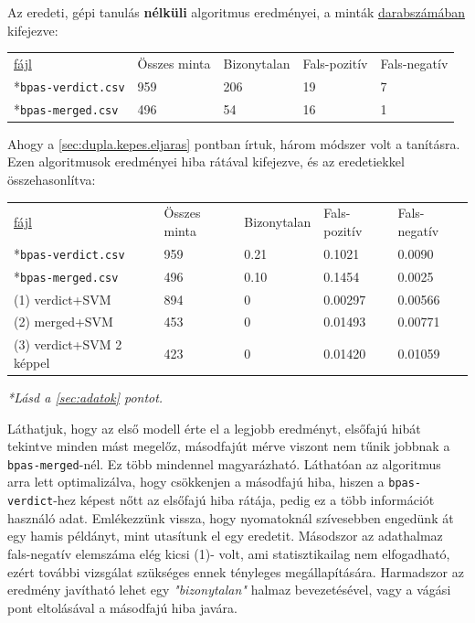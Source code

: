 \noindent
Az eredeti, gépi tanulás \textbf{nélküli} algoritmus eredményei, a minták \underline{darabszámában} 
kifejezve:

\begin{tabular}{ l l l l l }
	\underline{fájl} 			& Összes minta 	& Bizonytalan	& Fals-pozitív	& Fals-negatív \\
	*\texttt{bpas-verdict.csv} 	& 959 			& 206 			& 19	 	& 7			\\
	*\texttt{bpas-merged.csv} 	& 496			& 54 			& 16		& 1			\\
\end{tabular}

\mbox{}

\noindent
Ahogy a \ref{sec:dupla.kepes.eljaras} pontban írtuk, három módszer volt a tanításra.
Ezen algoritmusok eredményei hiba rátával kifejezve, és az eredetiekkel összehasonlítva:


\begin{tabular}{ l l l l l }
	\underline{fájl} 			& Összes minta 	& Bizonytalan	& Fals-pozitív	& Fals-negatív \\
	*\texttt{bpas-verdict.csv} 	& 959 			& 0.21			& 0.1021 	& 0.0090 	\\
	*\texttt{bpas-merged.csv} 	& 496			& 0.10			& 0.1454 	& 0.0025   \\
	
	\hline
	(1) verdict+SVM					& 894			& 0				& 0.00297	& 0.00566	\\
	(2) merged+SVM					& 453			& 0				& 0.01493	& 0.00771	\\
	(3) verdict+SVM 2 képpel		& 423			& 0				& 0.01420	& 0.01059   \\
	
\end{tabular}

\mbox{}


\textit{*Lásd a \ref{sec:adatok} pontot.}

\mbox{}



Láthatjuk, hogy az első modell érte el a legjobb eredményt, elsőfajú hibát tekintve minden mást megelőz, 
másodfajút mérve viszont nem tűnik jobbnak a \texttt{bpas-merged}-nél. Ez több mindennel magyarázható.
Láthatóan az algoritmus arra lett optimalizálva, hogy csökkenjen a másodfajú hiba, hiszen a 
\texttt{bpas-verdict}-hez képest nőtt az elsőfajú hiba rátája, pedig ez a több információt használó adat.
Emlékezzünk vissza, hogy nyomatoknál szívesebben engedünk át egy hamis példányt, mint utasítunk
el egy eredetit. Másodszor az adathalmaz fals-negatív elemszáma elég kicsi (1)- volt, ami 
statisztikailag nem elfogadható, ezért további vizsgálat szükséges ennek tényleges megállapítására.
Harmadszor az eredmény javítható lehet egy \textit{"bizonytalan"} halmaz bevezetésével, vagy 
a vágási pont eltolásával a másodfajú hiba javára.


